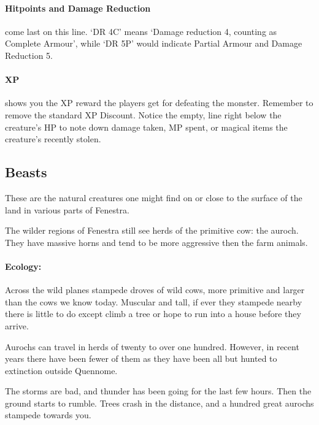 \begin{multicols}{2}
\paragraph{Hitpoints and Damage Reduction} come last on this line.  `DR 4C' means `Damage reduction 4, counting as Complete Armour', while `DR 5P' would indicate Partial Armour and Damage Reduction 5.

\paragraph{XP} shows you the XP reward the players get for defeating the monster.  Remember to remove the standard XP Discount.  Notice the empty, line right below the creature's HP to note down damage taken, MP spent, or magical items the creature's recently stolen.

\subsection{Beasts}

These are the natural creatures one might find on or close to the surface of the land in various parts of Fenestra.

\label{auroch}

The wilder regions of Fenestra still see herds of the primitive cow: the auroch.
They have massive horns and tend to be more aggressive then the farm animals.


\paragraph{Ecology:} Across the wild planes stampede droves of wild cows, more primitive and larger than the cows we know today.  Muscular and tall, if ever they stampede nearby there is little to do except climb a tree or hope to run into a house before they arrive.

Aurochs can travel in herds of twenty to over one hundred.  However, in recent years there have been fewer of them as they have been all but hunted to extinction outside Quennome.

\begin{boxtext}

  The storms are bad, and thunder has been going for the last few hours.  Then the ground starts to rumble.  Trees crash in the distance, and a hundred great aurochs stampede towards you.


\end{boxtext}
\end{multicols}
